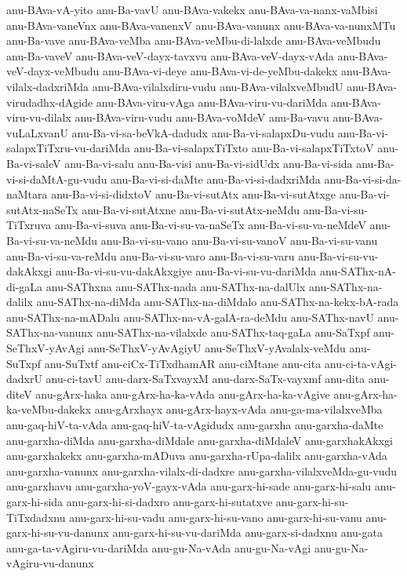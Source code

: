 {anu-BAva-vA-yito
anu-Ba-vavU
anu-BAva-vakekx
anu-BAva-va-nanx-vaMbisi
anu-BAva-vaneVnx
anu-BAva-vanenxV
anu-BAva-vanunx
anu-BAva-va-nunxMTu
anu-Ba-vave
anu-BAva-veMba
anu-BAva-veMbu-di-lalxde
anu-BAva-veMbudu
anu-Ba-vaveV
anu-BAva-veV-dayx-tavxvu
anu-BAva-veV-dayx-vAda
anu-BAva-veV-dayx-veMbudu
anu-BAva-vi-deye
anu-BAva-vi-de-yeMbu-dakekx
anu-BAva-vilalx-dadxriMda
anu-BAva-vilalxdiru-vudu
anu-BAva-vilalxveMbudU
anu-BAva-virudadhx-dAgide
anu-BAva-viru-vAga
anu-BAva-viru-vu-dariMda
anu-BAva-viru-vu-dilalx
anu-BAva-viru-vudu
anu-BAva-voMdeV
anu-Ba-vavu
anu-BAva-vuLaLxvanU
anu-Ba-vi-sa-beVkA-dadudx
anu-Ba-vi-salapxDu-vudu
anu-Ba-vi-salapxTiTxru-vu-dariMda
anu-Ba-vi-salapxTiTxto
anu-Ba-vi-salapxTiTxtoV
anu-Ba-vi-saleV
anu-Ba-vi-salu
anu-Ba-visi
anu-Ba-vi-sidUdx
anu-Ba-vi-sida
anu-Ba-vi-si-daMtA-gu-vudu
anu-Ba-vi-si-daMte
anu-Ba-vi-si-dadxriMda
anu-Ba-vi-si-da-naMtara
anu-Ba-vi-si-didxtoV
anu-Ba-vi-sutAtx
anu-Ba-vi-sutAtxge
anu-Ba-vi-sutAtx-naSeTx
anu-Ba-vi-sutAtxne
anu-Ba-vi-sutAtx-neMdu
anu-Ba-vi-su-TiTxruva
anu-Ba-vi-suva
anu-Ba-vi-su-va-naSeTx
anu-Ba-vi-su-va-neMdeV
anu-Ba-vi-su-va-neMdu
anu-Ba-vi-su-vano
anu-Ba-vi-su-vanoV
anu-Ba-vi-su-vanu
anu-Ba-vi-su-va-reMdu
anu-Ba-vi-su-varo
anu-Ba-vi-su-varu
anu-Ba-vi-su-vu-dakAkxgi
anu-Ba-vi-su-vu-dakAkxgiye
anu-Ba-vi-su-vu-dariMda
anu-SAThx-nA-di-gaLa
anu-SAThxna
anu-SAThx-nada
anu-SAThx-na-dalUlx
anu-SAThx-na-dalilx
anu-SAThx-na-diMda
anu-SAThx-na-diMdalo
anu-SAThx-na-kekx-bA-rada
anu-SAThx-na-mADalu
anu-SAThx-na-vA-galA-ra-deMdu
anu-SAThx-navU
anu-SAThx-na-vanunx
anu-SAThx-na-vilalxde
anu-SAThx-taq-gaLa
anu-SaTxpf
anu-SeThxV-yAvAgi
anu-SeThxV-yAvAgiyU
anu-SeThxV-yAvalalx-veMdu
anu-SuTxpf
anu-SuTxtf
anu-ciCx-TiTxdhamAR
anu-ciMtane
anu-cita
anu-ci-ta-vAgi-dadxrU
anu-ci-tavU
anu-darx-SaTxvayxM
anu-darx-SaTx-vayxmf
anu-dita
anu-diteV
anu-gArx-haka
anu-gArx-ha-ka-vAda
anu-gArx-ha-ka-vAgive
anu-gArx-ha-ka-veMbu-dakekx
anu-gArxhayx
anu-gArx-hayx-vAda
anu-ga-ma-vilalxveMba
anu-gaq-hiV-ta-vAda
anu-gaq-hiV-ta-vAgidudx
anu-garxha
anu-garxha-daMte
anu-garxha-diMda
anu-garxha-diMdale
anu-garxha-diMdaleV
anu-garxhakAkxgi
anu-garxhakekx
anu-garxha-mADuva
anu-garxha-rUpa-dalilx
anu-garxha-vAda
anu-garxha-vanunx
anu-garxha-vilalx-di-dadxre
anu-garxha-vilalxveMda-gu-vudu
anu-garxhavu
anu-garxha-yoV-gayx-vAda
anu-garx-hi-sade
anu-garx-hi-salu
anu-garx-hi-sida
anu-garx-hi-si-dadxro
anu-garx-hi-sutatxve
anu-garx-hi-su-TiTxdadxnu
anu-garx-hi-su-vadu
anu-garx-hi-su-vano
anu-garx-hi-su-vanu
anu-garx-hi-su-vu-danunx
anu-garx-hi-su-vu-dariMda
anu-garx-si-dadxnu
anu-gata
anu-ga-ta-vAgiru-vu-dariMda
anu-gu-Na-vAda
anu-gu-Na-vAgi
anu-gu-Na-vAgiru-vu-danunx
}
